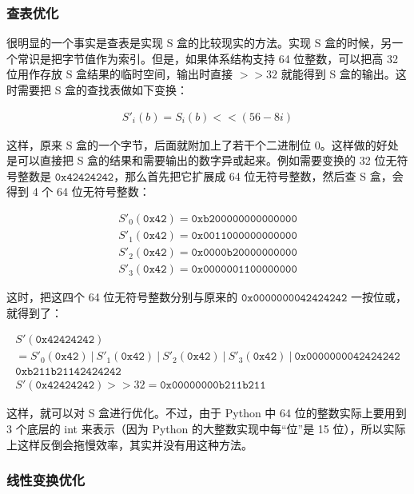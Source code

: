 \documentclass[a4paper, 10pt]{article}
\begin{document}
\subsubsection*{查表优化}

很明显的一个事实是查表是实现 S 盒的比较现实的方法。实现 S 盒的时候，另一个常识是把字节值作为索引。但是，如果体系结构支持 64 位整数，可以把高 32 位用作存放 S 盒结果的临时空间，输出时直接 $ >> 32 $ 就能得到 S 盒的输出。这时需要把 S 盒的查找表做如下变换：

\begin{gather*}
S'_i(b) = S_i(b) << (56 - 8i)
\end{gather*}

这样，原来 S 盒的一个字节，后面就附加上了若干个二进制位 0。这样做的好处是可以直接把 S 盒的结果和需要输出的数字异或起来。例如需要变换的 32 位无符号整数是 $ \mathtt{0x42424242} $，那么首先把它扩展成 64 位无符号整数，然后查 S 盒，会得到 4 个 64 位无符号整数：

\begin{gather*}
S'_0(\mathtt{0x42}) = \mathtt{0xb200000000000000} \\ 
S'_1(\mathtt{0x42}) = \mathtt{0x0011000000000000} \\ 
S'_2(\mathtt{0x42}) = \mathtt{0x0000b20000000000} \\ 
S'_3(\mathtt{0x42}) = \mathtt{0x0000001100000000}
\end{gather*}

这时，把这四个 64 位无符号整数分别与原来的 $ \mathtt{0x0000000042424242} $ 一按位或，就得到了：

\begin{gather*}
S'(\mathtt{0x42424242}) \\ 
= S'_0(\mathtt{0x42}) ~ | ~ S'_1(\mathtt{0x42}) ~ | ~ S'_2(\mathtt{0x42}) ~ | ~ S'_3(\mathtt{0x42}) ~ | ~ \mathtt{0x0000000042424242} \\ 
\mathtt{0xb211b21142424242} \\ 
S'(\mathtt{0x42424242}) >> 32 = \mathtt{0x00000000b211b211}
\end{gather*}

这样，就可以对 S 盒进行优化。不过，由于 Python 中 64 位的整数实际上要用到 3 个底层的 int 来表示（因为 Python 的大整数实现中每“位”是 15 位），所以实际上这样反倒会拖慢效率，其实并没有用这种方法。

\subsubsection*{线性变换优化}
\end{document}
